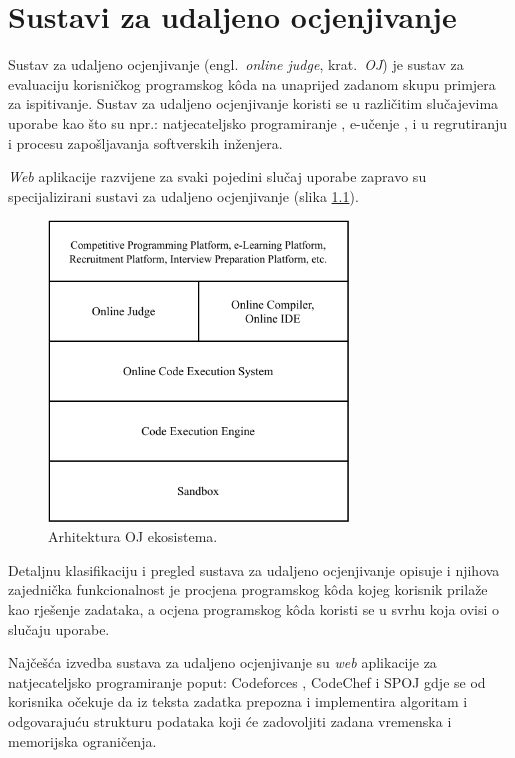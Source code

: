 \documentclass[times, utf8, diplomski]{fer}
\begin{document}
\chapter{Sustavi za udaljeno ocjenjivanje}
\label{chap:ojs}
Sustav za udaljeno ocjenjivanje (engl.\ \textit{online judge}, krat.\ \textit{OJ}) je sustav za evaluaciju korisničkog programskog kôda na unaprijed zadanom skupu primjera za ispitivanje. Sustav za udaljeno ocjenjivanje koristi se u različitim slučajevima uporabe  kao što su npr.: natjecateljsko programiranje , e-učenje , i u regrutiranju i procesu zapošljavanja  softverskih inženjera. \citep{9245310}

\textit{Web} aplikacije razvijene za svaki pojedini slučaj uporabe zapravo su specijalizirani sustavi za udaljeno ocjenjivanje (slika \ref{fig:oj-ecosystem}).

\begin{figure}[htb]
	\centering
	\includegraphics[width=8cm]{images/OJ_ecosystem.pdf}
	\caption{
		Arhitektura OJ ekosistema. \citep{9245310}
	}
	\label{fig:oj-ecosystem}
\end{figure}

Detaljnu klasifikaciju i pregled sustava za udaljeno ocjenjivanje opisuje \citep{wasik2018survey} i njihova zajednička funkcionalnost je procjena  programskog kôda kojeg korisnik prilaže kao rješenje zadataka, a ocjena  programskog kôda koristi se u svrhu koja ovisi o slučaju uporabe.

Najčešća izvedba sustava za udaljeno ocjenjivanje su \textit{web} aplikacije za natjecateljsko programiranje poput: Codeforces \citep{Codeforces}, CodeChef \citep{CodeChef} i SPOJ \citep{SPOJ} gdje se od korisnika očekuje da iz teksta zadatka prepozna i implementira algoritam i odgovarajuću strukturu podataka koji će zadovoljiti zadana vremenska i memorijska ograničenja. 
\end{document}
